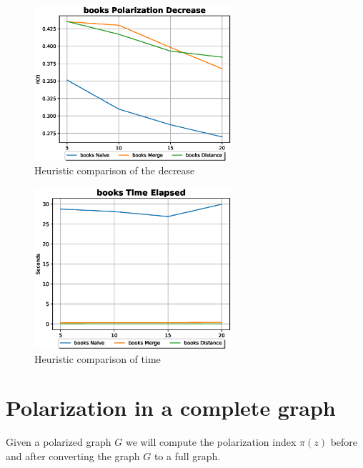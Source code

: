 \begin{figure}[!htbp]
	\centering
	\includegraphics[width=0.65\textwidth]{Figures/books_pol}
	\caption{Heuristic comparison of the decrease}
	\label{fig:books_pol}
\end{figure}


\begin{figure}[!htbp]
	\centering
	\includegraphics[width=0.65\textwidth]{Figures/books_time}
	\caption{Heuristic comparison of time}
	\label{fig:books_time}
\end{figure}



\section{Polarization in a complete graph}
\label{sec:fullgraph}
\vspace{20pt}
Given a polarized graph $G$ we will compute the polarization index $\pi(z)$ before and after converting the graph $G$ to a full graph. 

